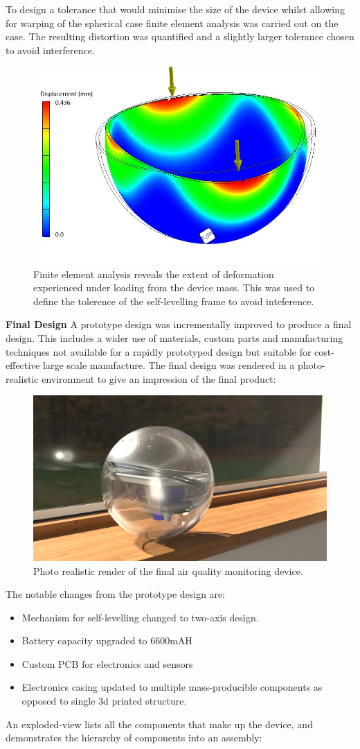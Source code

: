 To design a tolerance that would minimise the size of the device whilst allowing for warping of the spherical case finite element analysis was carried out on the case. The resulting distortion was quantified and a slightly larger tolerance chosen to avoid interference.

\begin{figure}[H]
\centering
\includegraphics[width=0.5\linewidth]{Engineering_hardware/Engineering_hardware_Figures/FEA.JPG}
\caption{Finite element analysis reveals the extent of deformation experienced under loading from the device mass. This was used to define the tolerence of the self-levelling frame to avoid inteference.}
\label{fig:15cm_shell_loading}
\end{figure}


\textbf{Final Design}
A prototype design was incrementally improved to produce a final design. This includes a wider use of materials, custom parts and manufacturing techniques not available for a rapidly prototyped design but suitable for cost-effective large scale manufacture. The final design was rendered in a photo-realistic environment to give an impression of the final product:

\begin{figure}[H]
\centering
\includegraphics[width=0.8\linewidth]{Engineering_hardware/Engineering_hardware_Figures/0300.png}
\caption{Photo realistic render of the final air quality monitoring device. }
\label{fig:15cm_shell_loading}
\end{figure}
The notable changes from the prototype design are:
\begin{itemize}
\item Mechanism for self-levelling changed to two-axis design.
\item Battery capacity upgraded to 6600mAH
\item Custom PCB for electronics and sensors
\item Electronics casing updated to multiple mass-producible components as opposed to single 3d printed structure.
\end{itemize}
An exploded-view lists all the components that make up the device, and demonstrates the hierarchy of components into an assembly:


